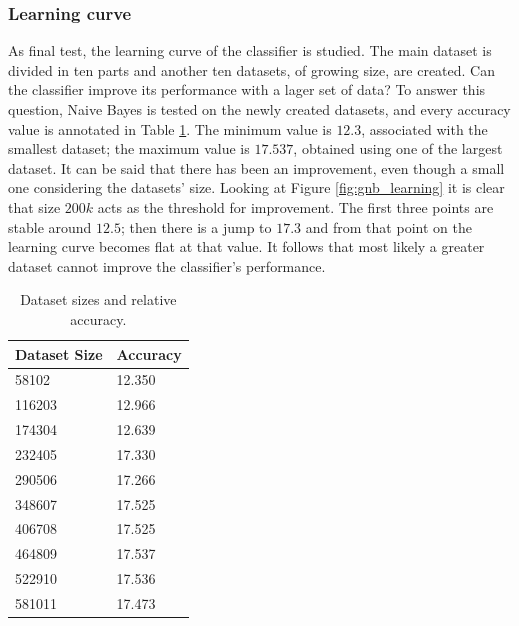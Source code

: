 \documentclass[a4paper, 10pt]{article}
\begin{document}
\subsubsection{Learning curve}

As final test, the learning curve of the classifier is studied. The main dataset is divided in ten parts and another ten datasets, of growing size, are created. Can the classifier improve its performance with a lager set of data? To answer this question, Naive Bayes is tested on the newly created datasets, and every accuracy value is annotated in Table \ref{tab:gnb_learning}. The minimum value is $12.3$, associated with the smallest dataset; the maximum value is $17.537$, obtained using one of the largest dataset. It can be said that there has been an improvement, even though a small one considering the datasets' size. Looking at Figure \ref{fig:gnb_learning} it is clear that size $200k$ acts as the threshold for improvement. The first three points are stable around $12.5$; then there is a jump to $17.3$ and from that point on the learning curve becomes flat at that value. It follows that most likely a greater dataset cannot improve the classifier's performance.

\begin{table}[h!]
\centering
\begin{tabular}{|l|l|}
\hline
\textbf{Dataset Size} & \textbf{Accuracy}\\\hline
58102 & 12.350\\\hline
116203 & 12.966\\\hline
174304 & 12.639\\\hline
232405 & 17.330\\\hline
290506 & 17.266\\\hline
348607 & 17.525\\\hline
406708 & 17.525\\\hline
464809 & 17.537\\\hline
522910 & 17.536\\\hline
581011 & 17.473\\\hline
\end{tabular}
\caption{Dataset sizes and relative accuracy.}
\label{tab:gnb_learning}
\end{table}
\end{document}
